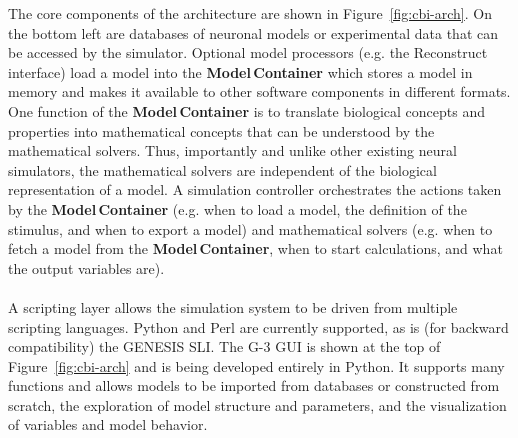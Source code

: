 \documentclass[10pt]{article}
\begin{document}
The core components of the architecture are shown in
Figure~\ref{fig:cbi-arch}. On the bottom left are
databases of neuronal models or experimental data that can be accessed
by the simulator. Optional model processors (e.g. the Reconstruct
interface) load a model into the {\bf Model\,Container} which stores a
model in memory and makes it available to other software components in
different formats.  One function of the {\bf Model\,Container} is to
translate biological concepts and properties into mathematical
concepts that can be understood by the mathematical solvers. Thus,
importantly and unlike other existing neural simulators, the
mathematical solvers are independent of the biological representation
of a model. A simulation controller orchestrates the actions taken by
the {\bf Model\,Container} (e.g. when to load a model, the definition
of the stimulus, and when to export a model) and mathematical solvers
(e.g. when to fetch a model from the {\bf Model\,Container}, when to
start
calculations, and what the output variables are).\\

 \\

A scripting layer allows the simulation system to be driven from
multiple scripting languages. Python and Perl are currently supported,
as is (for backward compatibility) the GENESIS SLI. The G-3 GUI is shown at the top of
Figure~\ref{fig:cbi-arch} and is being developed entirely in Python.  It supports many functions and
allows models to be imported from databases or constructed from
scratch, the exploration of model structure and parameters, and the
visualization of variables and model behavior.
\end{document}
